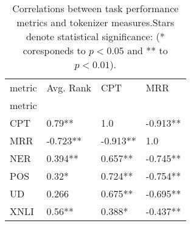 \begin{table}
\centering
\caption{Correlations between task performance metrics and tokenizer measures.Stars denote statistical significance: (* coresponeds to $p<0.05$ and ** to $p<0.01$).}
\label{tab:corr_in_lang_20l}
\begin{tabular}{llll}
\toprule
metric & Avg. Rank &       CPT &       MRR \\
metric &           &           &           \\
\midrule
CPT    &    0.79** &       1.0 &  -0.913** \\
MRR    &  -0.723** &  -0.913** &       1.0 \\
NER    &   0.394** &   0.657** &  -0.745** \\
POS    &     0.32* &   0.724** &  -0.754** \\
UD     &     0.266 &   0.675** &  -0.695** \\
XNLI   &    0.56** &    0.388* &  -0.437** \\
\bottomrule
\end{tabular}
\end{table}
